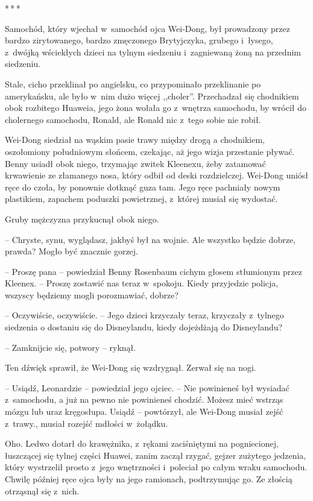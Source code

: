 \documentclass[oneside,polish,11pt,rmheadings]{mwbk}
\newcommand{\threeast}{\par\centerline{*\,*\,*}\medskip\par}
\begin{document}
\bigskip
\threeast

Samochód, który wjechał w~samochód ojca Wei-Dong, był prowadzony przez bardzo zirytowanego, bardzo zmęczonego Brytyjczyka, grubego i~łysego, z~dwójką wściekłych dzieci na tylnym siedzeniu i~zagniewaną żoną na przednim siedzeniu. 


Stale, cicho przeklinał po angielsku, co przypominało przeklinanie po amerykańsku, ale było w~nim dużo więcej ,,choler''. Przechadzał się chodnikiem obok rozbitego Huaweia, jego żona wołała go z~wnętrza samochodu, by wrócił do cholernego samochodu, Ronald, ale Ronald nic z~tego sobie nie robił. 


Wei-Dong siedział na wąskim pasie trawy między drogą a chodnikiem, oszołomiony południowym słońcem, czekając, aż jego wizja przestanie pływać. Benny usiadł obok niego, trzymając zwitek Kleenexu, żeby zatamować krwawienie ze złamanego nosa, który odbił od deski rozdzielczej. Wei-Dong uniósł ręce do czoła, by ponownie dotknąć guza tam. Jego ręce pachniały nowym plastikiem, zapachem poduszki powietrznej, z~której musiał się wydostać. 


Gruby mężczyzna przykucnął obok niego. 

-- Chryste, synu, wyglądasz, jakbyś był na wojnie. Ale wszystko będzie dobrze, prawda? Mogło być znacznie gorzej. 


-- Proszę pana -- powiedział Benny Rosenbaum cichym głosem stłumionym przez Kleenex. -- Proszę zostawić nas teraz w~spokoju. Kiedy przyjedzie policja, wszyscy będziemy mogli porozmawiać, dobrze?  


-- Oczywiście, oczywiście. -- Jego dzieci krzyczały teraz, krzyczały z~tylnego siedzenia o dostaniu się do Disneylandu, kiedy dojeżdżają do Disneylandu? 

-- Zamknijcie się, potwory -- ryknął. 

Ten dźwięk sprawił, że Wei-Dong się wzdrygnął. Zerwał się na nogi. 


-- Usiądź, Leonardzie -- powiedział jego ojciec. -- Nie powinieneś był wysiadać z~samochodu, a już na pewno nie powinieneś chodzić. Możesz mieć wstrząs mózgu lub uraz kręgosłupa. Usiądź -- powtórzył, ale Wei-Dong musiał zejść z~trawy., musiał rozejść mdłości w~żołądku. 


Oho. Ledwo dotarł do krawężnika, z~rękami zaciśniętymi na pogniecionej, łuszczącej się tylnej części Huawei, zanim zaczął rzygać, gejzer zużytego jedzenia, który wystrzelił prosto z~jego wnętrzności i~poleciał po całym wraku samochodu. Chwilę później ręce ojca były na jego ramionach, podtrzymując go. Ze złością otrząsnął się z~nich. 
\end{document}

